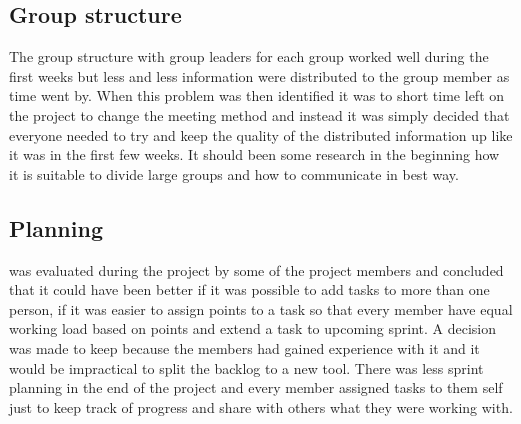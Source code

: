 \subsection{Group structure}
The group structure with group leaders for each group worked well during the first weeks but less and less information were distributed to the group member as time went by. When this problem was then identified it was to short time left on the project to change the meeting method and instead it was simply decided that everyone needed to try and keep the quality of the distributed information up like it was in the first few weeks. It should been some research in the beginning how it is suitable to divide large groups and how to communicate in best way.

\subsection{Planning}
\taiga{} was evaluated during the project by some of the project members and concluded that it could have been better if it was possible to add tasks to more than one person, if it was easier to assign points to a task so that every member have equal working load based on points and extend a task to upcoming sprint. A decision was made to keep \taiga{} because the members had gained experience with it and it would be impractical to split the backlog to a new tool. There was less sprint planning in the end of the project and every member assigned tasks to them self just to keep track of progress and share with others what they were working with.

